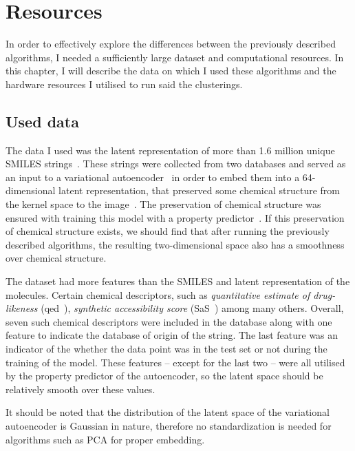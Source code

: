 \chapter{Resources}\label{ch:resources}

In order to effectively explore the differences between the previously described algorithms, I needed a sufficiently large dataset and computational resources. In this chapter, I will describe the data on which I used these algorithms and the hardware resources I utilised to run said the clusterings.

\section{Used data}\label{sec:used-data}

The data I used was the latent representation of more than 1.6 million unique SMILES strings~\cite{bib:smiles}. These strings were collected from two databases and served as an input to a variational autoencoder~\cite{bib:vae} in order to embed them into a 64-dimensional latent representation, that preserved some chemical structure from the kernel space to the image~\cite{bib:thesis}.
The preservation of chemical structure was ensured with training this model with a property predictor~\cite{bib:prop_pred}. If this preservation of chemical structure exists, we should find that after running the previously described algorithms, the resulting two-dimensional space also has a smoothness over chemical structure.

The dataset had more features than the SMILES and latent representation of the molecules. Certain chemical descriptors, such as \textit{quantitative estimate of drug-likeness} (qed~\cite{bib:qed}), \textit{synthetic accessibility score} (SaS~\cite{bib:sas}) among many others. Overall, seven such chemical descriptors were included in the database along with one feature to indicate the database of origin of the string. The last feature was an indicator of the whether the data point was in the test set or not during the training of the model. These features -- except for the last two -- were all utilised by the property predictor of the autoencoder, so the latent space should be relatively smooth over these values.

It should be noted that the distribution of the latent space of the variational autoencoder is Gaussian in nature, therefore no standardization is needed for algorithms such as PCA for proper embedding.

